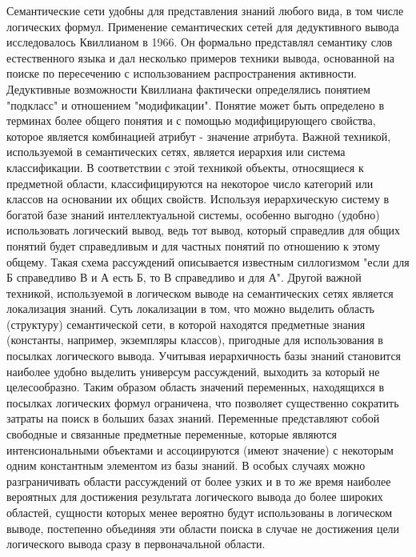 Семантические сети удобны для представления знаний любого вида, в том числе логических формул. Применение семантических сетей для дедуктивного вывода исследовалось Квиллианом в 1966. Он формально представлял семантику слов естественного языка и дал несколько примеров техники вывода, основанной на поиске по пересечению с использованием распространения активности. Дедуктивные возможности Квиллиана фактически определялись понятием "подкласс" и отношением "модификации". Понятие может быть определено в терминах более общего понятия и с помощью модифицирующего свойства, которое является комбинацией атрибут - значение атрибута.
Важной техникой, используемой в семантических сетях, является иерархия или система классификации. В соответствии с этой техникой объекты, относящиеся к предметной области, классифицируются на некоторое число категорий или классов на основании их общих свойств. Используя иерархическую систему в богатой базе знаний интеллектуальной системы, особенно выгодно (удобно) использовать логический вывод, ведь тот вывод, который справедлив для общих понятий будет справедливым и для частных понятий по отношению к этому общему. Такая схема рассуждений описывается известным силлогизмом "если для Б справедливо В и А есть Б, то В справедливо и для А". 
Другой важной техникой, используемой в логическом выводе на семантических сетях является локализация знаний. Суть локализации в том, что можно выделить область (структуру) семантической сети, в которой находятся предметные знания (константы, например, экземпляры классов), пригодные для использования в посылках логического вывода. Учитывая иерархичность базы знаний становится наиболее удобно выделить универсум рассуждений, выходить за который не целесообразно. Таким образом область значений переменных, находящихся в посылках логических формул ограничена, что позволяет существенно сократить затраты на поиск в больших базах знаний. 
Переменные представляют собой свободные и связанные предметные переменные, которые являются интенсиональными объектами и ассоциируются (имеют значение) с некоторым одним константным элементом из базы знаний. 
В особых случаях можно разграничивать области рассуждений от более узких и в то же время наиболее вероятных для достижения результата логического вывода до более широких областей, сущности которых менее вероятно будут использованы в логическом выводе, постепенно объединяя эти области поиска в случае не достижения цели логического вывода сразу в первоначальной области.

